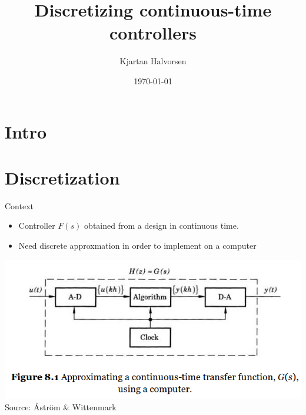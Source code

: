 \documentclass[presentation,aspectratio=1610]{beamer}
\author{Kjartan Halvorsen}
\date{\today}
\title{Discretizing continuous-time controllers}
\begin{document}
\maketitle


\section{Intro}
\label{sec:org9a2e388}

\section{Discretization}
\label{sec:orgee27423}
\begin{frame}[label={sec:orgd3c4ac1}]{Context}
\begin{itemize}
\item Controller \(F(s)\) obtained from a design in continuous time.
\end{itemize}
\pause
\begin{itemize}
\item Need discrete approxmation in order to implement on a computer
\end{itemize}

\begin{center}
 \includegraphics[width=0.7\linewidth]{../../figures/fig8-1.png}\\
 \footnotesize Source: Åström \& Wittenmark 
\end{center}
\end{frame}
\end{document}
